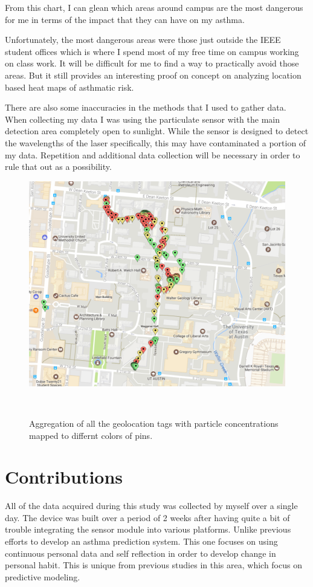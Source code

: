 \documentclass{sigchi}
\begin{document}
From this chart, I can glean which areas
around campus are the most dangerous for me in terms of the impact that they can have on
my asthma.

Unfortunately, the most dangerous areas were those just outside the IEEE student
offices which is where I spend most of my free time on campus working on class work.
It will be difficult for me to find a way to practically avoid those areas. But it
still provides an interesting proof on concept on analyzing location based heat maps
of asthmatic risk.

There are also some inaccuracies in the methods that I used to gather data. When
collecting my data I was using the particulate sensor with the main detection area
completely open to sunlight. While the sensor is designed to detect the wavelengths
of the laser specifically, this may have contaminated a portion of my data. Repetition
and additional data collection will be necessary in order to rule that out as a
possibility.

\begin{figure}
\centering
  \includegraphics[width=0.9\columnwidth]{figures/map}
  \caption{ Aggregation of all the geolocation tags with particle concentrations
  mapped to differnt colors of pins.
  }~\label{fig:figure4}
\end{figure}

\section{Contributions}

All of the data acquired during this study was collected by myself over a single day.
The device was built over a period of 2 weeks after having quite a bit of trouble
integrating the sensor module into various platforms. Unlike previous efforts to develop
an asthma prediction system. This one focuses on using continuous personal data
and self reflection in order to develop change in personal habit. This is unique from
previous studies in this area, which focus on predictive modeling. \cite{lowpower, farr_2016}
\end{document}
